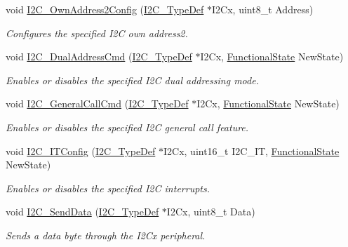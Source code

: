 \begin{DoxyCompactItemize}
void \hyperlink{group___i2_c___private___functions_ga7be2cc634a613c8e3539137e897a22df}{I2\+C\+\_\+\+Own\+Address2\+Config} (\hyperlink{struct_i2_c___type_def}{I2\+C\+\_\+\+Type\+Def} $\ast$I2\+Cx, uint8\+\_\+t Address)
\begin{DoxyCompactList}\small\item\em Configures the specified I2C own address2. \end{DoxyCompactList}\item 
void \hyperlink{group___i2_c___private___functions_ga02145a333a56e79557d6ef4ea03fc313}{I2\+C\+\_\+\+Dual\+Address\+Cmd} (\hyperlink{struct_i2_c___type_def}{I2\+C\+\_\+\+Type\+Def} $\ast$I2\+Cx, \hyperlink{group___exported__types_gac9a7e9a35d2513ec15c3b537aaa4fba1}{Functional\+State} New\+State)
\begin{DoxyCompactList}\small\item\em Enables or disables the specified I2C dual addressing mode. \end{DoxyCompactList}\item 
void \hyperlink{group___i2_c___private___functions_ga65c740fc8d7b3b9f15cc432d8699d471}{I2\+C\+\_\+\+General\+Call\+Cmd} (\hyperlink{struct_i2_c___type_def}{I2\+C\+\_\+\+Type\+Def} $\ast$I2\+Cx, \hyperlink{group___exported__types_gac9a7e9a35d2513ec15c3b537aaa4fba1}{Functional\+State} New\+State)
\begin{DoxyCompactList}\small\item\em Enables or disables the specified I2C general call feature. \end{DoxyCompactList}\item 
void \hyperlink{group___i2_c___private___functions_ga58fed146a06cb81d2940604e460de047}{I2\+C\+\_\+\+I\+T\+Config} (\hyperlink{struct_i2_c___type_def}{I2\+C\+\_\+\+Type\+Def} $\ast$I2\+Cx, uint16\+\_\+t I2\+C\+\_\+\+IT, \hyperlink{group___exported__types_gac9a7e9a35d2513ec15c3b537aaa4fba1}{Functional\+State} New\+State)
\begin{DoxyCompactList}\small\item\em Enables or disables the specified I2C interrupts. \end{DoxyCompactList}\item 
void \hyperlink{group___i2_c___private___functions_ga7bd9e70b8eafde0dd5eb42b0d95fe1a9}{I2\+C\+\_\+\+Send\+Data} (\hyperlink{struct_i2_c___type_def}{I2\+C\+\_\+\+Type\+Def} $\ast$I2\+Cx, uint8\+\_\+t Data)
\begin{DoxyCompactList}\small\item\em Sends a data byte through the I2\+Cx peripheral. \end{DoxyCompactList}\item 

\end{DoxyCompactItemize}
